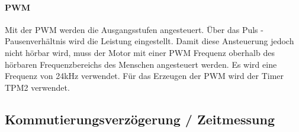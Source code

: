 \paragraph{PWM}$~~$\vspace{2mm}\\
\fi
Mit der PWM werden 
die Ausgangsstufen angesteuert. Über das Puls - Pausenverhältnis wird die 
Leistung eingestellt. Damit diese Ansteuerung jedoch nicht hörbar wird, muss 
der Motor mit einer PWM Frequenz oberhalb des hörbaren Frequenzbereichs des 
Menschen angesteuert werden. Es wird eine Frequenz von 24\si{\kilo\hertz} 
verwendet.  Für das Erzeugen der PWM wird der Timer TPM2 verwendet. 

\ifSTANDALONE
\subsection{Kommutierungsverzögerung / Zeitmessung}
\fi
\ifEMBED
